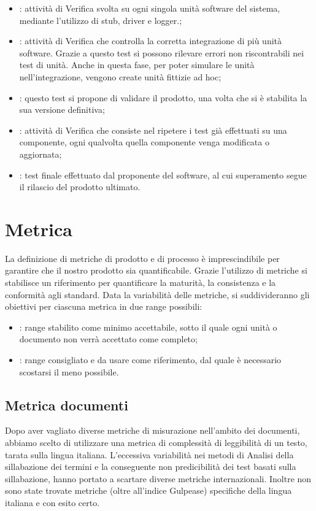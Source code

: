 \begin{itemize}
\item {}: attività di Verifica svolta su ogni singola unità software del sistema, mediante l'utilizzo di stub, driver e logger.;
\item {}: attività di Verifica che controlla la corretta integrazione di più unità software. Grazie a questo test si possono rilevare errori non riscontrabili nei test di unità. Anche in questa fase, per poter simulare le unità nell'integrazione, vengono create unità fittizie ad hoc;
\item {}: questo test si propone di validare il prodotto, una volta che si è stabilita  la sua versione definitiva;
\item {}: attività di Verifica che consiste nel ripetere i test già effettuati su una componente, ogni qualvolta quella componente venga modificata o aggiornata;
\item {}: test finale effettuato dal proponente del software, al cui superamento segue il rilascio del prodotto ultimato.
\end{itemize}

\newpage
\section{Metrica}
\label{4.0}
La definizione di metriche di prodotto e di processo è imprescindibile per garantire che il nostro prodotto sia quantificabile. Grazie l'utilizzo di metriche si stabilisce un riferimento per quantificare la maturità, la consistenza e la conformità agli standard.
Data la variabilità delle metriche, si suddivideranno gli obiettivi per ciascuna metrica in due range possibili:
\begin{itemize}
\item {}: range stabilito come minimo accettabile, sotto il quale ogni unità o documento non verrà accettato come completo;
\item {}: range consigliato e da usare come riferimento, dal quale è necessario scostarsi il meno possibile.
\end{itemize}

\subsection{Metrica documenti}
\label{4.1}
Dopo aver vagliato diverse metriche di misurazione nell'ambito dei documenti, abbiamo scelto di utilizzare una metrica di complessità di leggibilità di un testo, tarata sulla lingua italiana. L'eccessiva variabilità nei metodi di Analisi della sillabazione dei termini e la conseguente non predicibilità dei test basati sulla sillabazione, hanno portato a scartare diverse metriche internazionali. Inoltre non sono state trovate metriche (oltre all'indice Gulpease) specifiche della lingua italiana e con esito certo.

